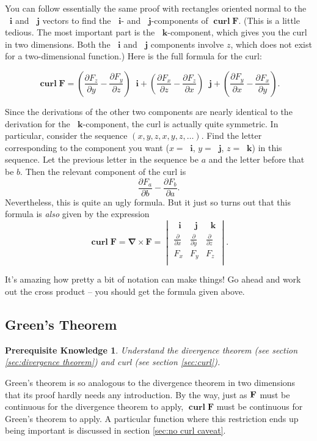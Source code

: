 \documentclass{myarticle}
\let\div\relax
\DeclareMathOperator{\div}{div}
\DeclareMathOperator{\curl}{\mathbf{curl}}
\renewcommand{\vec}[1]{\mathbf{#1}}
\newcommand{\unitvector}[1]{
  \mathop{}\!\vec{#1}
}
\newcommand{\ih}{\unitvector{i}}
\newcommand{\jh}{\unitvector{j}}
\newcommand{\kh}{\unitvector{k}}
\newcommand{\del}{\boldsymbol{\nabla}}
\theoremstyle{nospace}
\newtheorem*{oldprereq}{Prerequisite Knowledge}
\newenvironment{prereq}{\begin{mdframed}\begin{oldprereq}}{\end{oldprereq}\end{mdframed}}
\newtheorem{old series theorem}{Theorem}
\newenvironment{series theorem}{\begin{mdframed}\begin{old series theorem}}{\end{old series theorem}\end{mdframed}}
\begin{document}
You can follow essentially the same proof with rectangles oriented normal to the $\ih$ and $\jh$ vectors to find the $\ih$- and $\jh$-components of $\curl \vec{F}$. (This is a little tedious. The most important part is the $\kh$-component, which gives you the curl in two dimensions. Both the $\ih$ and $\jh$ components involve $z$, which does not exist for a two-dimensional function.) Here is the full formula for the curl:

\[ \curl \vec{F} = \left(\frac{\partial F_z}{\partial y} - \frac{\partial F_y}{\partial z}\right) \ih + \left(\frac{\partial F_x}{\partial z} - \frac{\partial F_z}{\partial x}\right) \jh + \left(\frac{\partial F_y}{\partial x} - \frac{\partial F_x}{\partial y}\right). \]

Since the derivations of the other two components are nearly identical to the derivation for the $\kh$-component, the curl is actually quite symmetric. In particular, consider the sequence $(x, y, z, x, y, z, \dots)$. Find the letter corresponding to the component you want ($x = \ih$, $y = \jh$, $z = \kh$) in this sequence. Let the previous letter in the sequence be $a$ and the letter before that be $b$. Then the relevant component of the curl is \[ \frac{\partial F_a}{\partial b} - \frac{\partial F_b}{\partial a}. \] Nevertheless, this is quite an ugly formula. But it just so turns out that this formula is \textit{also} given by the expression \[ \curl \vec{F} = \del \times \vec{F} = \begin{vmatrix}
\ih & \jh & \kh \\
\frac{\partial}{\partial x} & \frac{\partial}{\partial y} & \frac{\partial}{\partial z} \\
F_x & F_y & F_z \\
\end{vmatrix}. \]

It's amazing how pretty a bit of notation can make things! Go ahead and work out the cross product -- you should get the formula given above.

\subsection{Green's Theorem} \label{sec:greens theorem}

\begin{prereq} Understand the divergence theorem (see section \ref{sec:divergence theorem}) and curl (see section \ref{sec:curl}). \end{prereq}

Green's theorem is so analogous to the divergence theorem in two dimensions that its proof hardly needs any introduction. By the way, just as $\div \vec{F}$ must be continuous for the divergence theorem to apply, $\curl \vec{F}$ must be continuous for Green's theorem to apply. A particular function where this restriction ends up being important is discussed in section \ref{sec:no curl caveat}.
\end{document}
